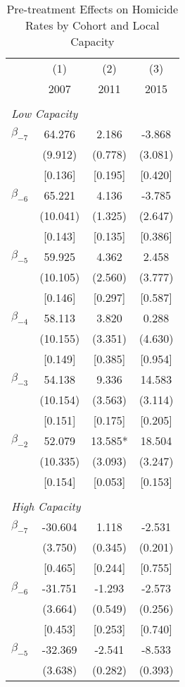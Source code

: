 \documentclass[]{article}
\begin{document}
\begin{table}[htbp]
\caption{Pre-treatment Effects on Homicide Rates by Cohort and Local Capacity}
\begin{tabular}{lccc}
\hline\hline
& (1) & (2) & (3) \\
& 2007 & 2011 & 2015 \\
\hline
& & & \\
\multicolumn{4}{l}{\textit{Low Capacity}} \\
$\beta_{-7}$ & 64.276 & 2.186 & -3.868 \\
& (9.912) & (0.778) & (3.081) \\
& [0.136] & [0.195] & [0.420] \\
$\beta_{-6}$ & 65.221 & 4.136 & -3.785 \\
& (10.041) & (1.325) & (2.647) \\
& [0.143] & [0.135] & [0.386] \\
$\beta_{-5}$ & 59.925 & 4.362 & 2.458 \\
& (10.105) & (2.560) & (3.777) \\
& [0.146] & [0.297] & [0.587] \\
$\beta_{-4}$ & 58.113 & 3.820 & 0.288 \\
& (10.155) & (3.351) & (4.630) \\
& [0.149] & [0.385] & [0.954] \\
$\beta_{-3}$ & 54.138 & 9.336 & 14.583 \\
& (10.154) & (3.563) & (3.114) \\
& [0.151] & [0.175] & [0.205] \\
$\beta_{-2}$ & 52.079 & 13.585* & 18.504 \\
& (10.335) & (3.093) & (3.247) \\
& [0.154] & [0.053] & [0.153] \\
& & & \\
\hline
\multicolumn{4}{l}{\textit{High Capacity}} \\
$\beta_{-7}$ & -30.604 & 1.118 & -2.531\\
& (3.750) & (0.345) & (0.201) \\
& [0.465] & [0.244] & [0.755] \\
$\beta_{-6}$ & -31.751 & -1.293 & -2.573 \\
& (3.664) & (0.549) & (0.256) \\
& [0.453] & [0.253] & [0.740] \\
$\beta_{-5}$ & -32.369 & -2.541 & -8.533 \\
& (3.638) & (0.282) & (0.393) \\

\end{tabular}
\end{table}
\end{document}
